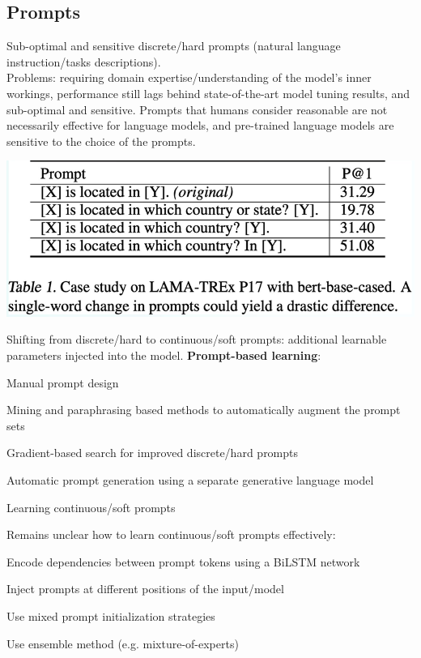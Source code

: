 \documentclass[10pt]{report}
\begin{document}
\subsection{Prompts}
Sub-optimal and sensitive discrete/hard prompts (natural language instruction/tasks descriptions).\\
Problems: requiring domain expertise/understanding of the model's inner workings, performance still lags behind state-of-the-art model tuning results, and sub-optimal and sensitive. Prompts that humans consider reasonable are not necessarily effective for language models, and pre-trained language models are sensitive to the choice of the prompts.
\begin{center}
	\includegraphics[scale=0.5]{86.png}
\end{center}
Shifting from discrete/hard to continuous/soft prompts: additional learnable parameters injected into the model. \textbf{Prompt-based learning}:\begin{list}{}{}
	\item Manual prompt design
	\item Mining and paraphrasing based methods to automatically augment the prompt sets
	\item Gradient-based search for improved discrete/hard prompts
	\item Automatic prompt generation using a separate generative language model
	\item Learning continuous/soft prompts
\end{list}
Remains unclear how to learn continuous/soft prompts effectively:
\begin{list}{}{}
	\item Encode dependencies between prompt tokens using a BiLSTM network
	\item Inject prompts at different positions of the input/model
	\item Use mixed prompt initialization strategies
	\item Use ensemble method (e.g. mixture-of-experts)
\end{list}
\end{document}
